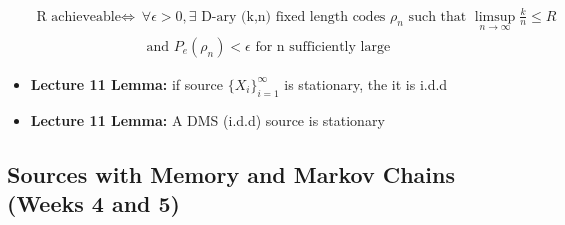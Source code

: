 \documentclass{article}
\begin{document}
\begin{itemize}
    \begin{align*}
        \text{R achieveable} \Longleftrightarrow & \forall \epsilon>0, \exists \text{ D-ary (k,n) fixed length codes } \rho_n \text{ such that } \limsup_{n \to\infty}\frac{k}{n}\leq R \\
         & \text{ and } P_e(\rho_n)<\epsilon \text{ for n sufficiently large}
    \end{align*}

    \item \textbf{Lecture 11 Lemma:} if source \(\{X_i\}_{i=1}^\infty\) is stationary, the it is i.d.d
    \item \textbf{Lecture 11 Lemma:} A DMS (i.d.d) source is stationary
\end{itemize}
\subsection{Sources with Memory and Markov Chains (Weeks 4 and 5)}
\end{document}
